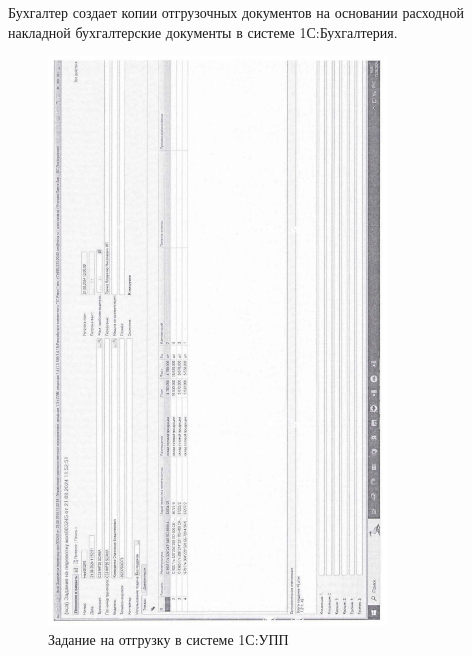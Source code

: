 Бухгалтер создает копии отгрузочных документов на основании расходной накладной бухгалтерские документы в системе 1С:Бухгалтерия.




\begin{figure}
\begin{center}
  \includegraphics[height=0.8\textheight, width=0.8\textwidth, keepaspectratio]{Pics/d25.jpg}
\end{center}
  \caption{Задание на отгрузку в системе 1С:УПП}
  \label{pic:d25}
\end{figure}



